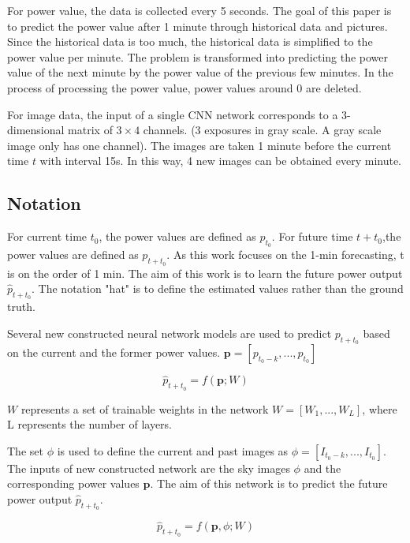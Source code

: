 For power value, the data is collected every 5 seconds. The goal of this paper is to predict the power value after 1 minute through historical data and pictures. Since the historical data is too much, the historical data is simplified to the power value per minute. The problem is transformed into predicting the power value of the next minute by the power value of the previous few minutes. In the process of processing the power value,  power values around 0 are deleted.



For image data, the input of a single CNN network corresponds to a 3-dimensional matrix of $3 \times 4$ channels. (3 exposures in gray scale. A gray scale image only has one channel). The images are taken 1 minute before the current time $t$ with interval 15s. In this way, 4 new images can be obtained every minute.


\subsection{Notation}

For current time $t_{0}$, the power values are defined as $p_{t_{0}}$. For future time $t+t_{0}$,the power values are defined as $p_{t+t_{0}}$. As this work focuses on the 1-min forecasting, t is on the order of 1 min. The aim of this work is to learn the future power output $\hat{p}_{t+t_{0}}$. The notation "hat" is to define the estimated values rather than the ground truth. 

Several new constructed neural network models are used to predict $p_{t+t_{0}}$ based on the current and the former power values.
	$\mathbf{p}=[{ p_{t_{0}-k}, ... , p_{t_{0}} }]$

\begin{equation}
	\hat{p}_{t+t_{0}}=f(\mathbf{p};W)
\end{equation}
 
$W$ represents a set of trainable weights in the network $W=[W_{1}, ... , W_{L}]$, where L represents the number of layers.

The set $\phi$ is used to define the current and past images as $\phi =[I_{t_{0}-k}, ... , I_{t_{0}}]$. The inputs of new constructed network are the sky images $\phi$ and the corresponding power values $\mathbf{p}$. The aim of this network is to predict the future power output $\hat{p}_{t+t_{0}}$.

\begin{equation}
	\hat{p}_{t+t_{0}}=f(\mathbf{p},\phi;W)
\end{equation}





